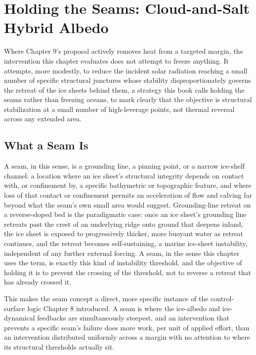 \documentclass[11pt,oneside]{book}
\begin{document}
\chapter{Holding the Seams: Cloud-and-Salt Hybrid Albedo}

Where Chapter 9's proposal actively removes heat from a targeted margin, the intervention this chapter evaluates does not attempt to freeze anything. It attempts, more modestly, to reduce the incident solar radiation reaching a small number of specific structural junctures whose stability disproportionately governs the retreat of the ice sheets behind them, a strategy this book calls holding the seams rather than freezing oceans, to mark clearly that the objective is structural stabilization at a small number of high-leverage points, not thermal reversal across any extended area.

\section*{What a Seam Is}

A seam, in this sense, is a grounding line, a pinning point, or a narrow ice-shelf channel: a location where an ice sheet's structural integrity depends on contact with, or confinement by, a specific bathymetric or topographic feature, and where loss of that contact or confinement permits an acceleration of flow and calving far beyond what the seam's own small area would suggest. Grounding-line retreat on a reverse-sloped bed is the paradigmatic case: once an ice sheet's grounding line retreats past the crest of an underlying ridge onto ground that deepens inland, the ice sheet is exposed to progressively thicker, more buoyant water as retreat continues, and the retreat becomes self-sustaining, a marine ice-sheet instability, independent of any further external forcing. A seam, in the sense this chapter uses the term, is exactly this kind of instability threshold, and the objective of holding it is to prevent the crossing of the threshold, not to reverse a retreat that has already crossed it.

This makes the seam concept a direct, more specific instance of the control-surface logic Chapter 8 introduced. A seam is where the ice-albedo and ice-dynamical feedbacks are simultaneously steepest, and an intervention that prevents a specific seam's failure does more work, per unit of applied effort, than an intervention distributed uniformly across a margin with no attention to where its structural thresholds actually sit.
\end{document}
